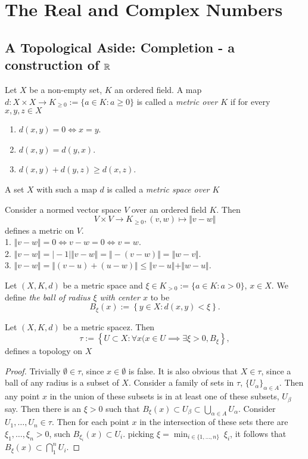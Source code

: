 \section{The Real and Complex Numbers}
\subsection{A Topological Aside: Completion - a construction of $\mathbb{R}$}
    \begin{definition}
        Let $X$ be a non-empty set, $K$ an ordered field. A map $d:X\times X\rightarrow K_{\geq 0}:=\{ a\in K: a\geq 0\}$ is called a \textit{metric over $K$} if for every $x,y,z\in X$
        \begin{enumerate}
            \item $d(x,y)=0 \iff x=y$.
            \item $d(x,y)=d(y,x)$.
            \item $d(x,y)+d(y,z)\geq d(x,z)$.
        \end{enumerate}
        A set $X$ with such a map $d$ is called a \textit{metric space over $K$}
    \end{definition}
    \begin{remark}
        Consider a normed vector space $V$ over an ordered field $K$. Then $$V\times V\rightarrow K_{\geq0}, (v,w)\mapsto \Vert v-w\Vert$$ 
        defines a metric on $V$.\\ 
        1. $\Vert v-w\Vert =0 \iff v-w=0\iff v=w$.\\
        2. $\Vert v-w\Vert = \vert -1\vert \Vert v-w \Vert = \Vert -(v-w)\Vert = \Vert w-v\Vert.$\\
        3. $\Vert v-w\Vert = \Vert (v-u)+(u-w)\Vert\leq \Vert v-u\Vert +\Vert w-u\Vert.$
    \end{remark}
    \begin{definition}
        Let $(X,K,d)$ be a metric space and $\xi \in K_{>0}:=\{ a\in K:a>0\}$, $x\in X$. We define \textit{the ball of radius $\xi$ with center $x$} to be
        $$B_\xi(x):= \left\{ y\in X: d(x,y)<\xi\right\}.$$
    \end{definition}
    \begin{lemma}
        Let $(X,K,d)$ be a metric spacez. Then
        $$\tau := \left\{U\subset X : \forall x(x\in U \implies \exists \xi >0, B_\xi\right\},$$
        defines a topology on $X$
    \end{lemma}
    \begin{proof}
        Trivially $\emptyset\in \tau$, since $x\in \emptyset$ is false. It is also obvious that $X\in \tau$, since a ball of any radius is a subset of $X$. Consider a family of sets in $\tau$, $\{U_\alpha\}_{\alpha \in A}$. Then any point $x$ in the union of these subsets is in at least one of these subsets, $U_\beta$ say. Then there is an $\xi>0$ such that $B_\xi(x)\subset U_\beta \subset\bigcup_{\alpha\in A} U_\alpha$. Consider $U_1,\dots,U_n\in \tau$. Then for each point $x$ in the intersection of these sets there are $\xi_1,\dots,\xi_n>0$, such $B_{\xi_i}(x)\subset U_i$. picking $\xi=\min_{i\in\{1,\dots,n\}} \ \xi_i$, it follows that $B_\xi(x)\subset \bigcap_1^n U_i$.
    \end{proof}
